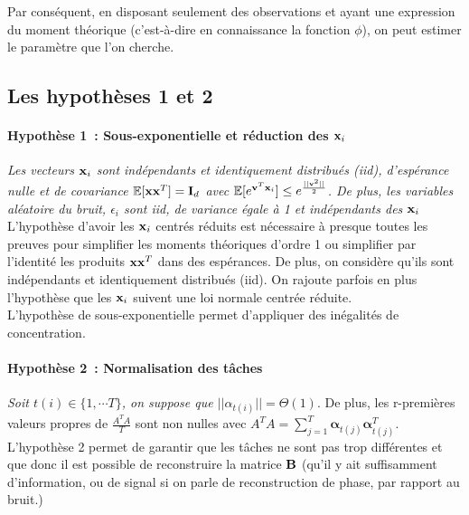 \documentclass[12pt]{article}
\begin{document}
Par conséquent, en disposant seulement des observations et ayant une expression du moment théorique (c'est-à-dire en connaissance la fonction $\phi$), on peut estimer le paramètre que l'on cherche. 

\subsection{Les hypothèses 1 et 2}\label{hypothèses}
\paragraph*{Hypothèse 1~: Sous-exponentielle et réduction des ${\bf x}_i$}\label{hyp2} \textit{Les vecteurs ${\bf x}_i$ sont indépendants et identiquement distribués (iid), d'espérance nulle et de covariance $\mathbb{E}[{\bf x}{\bf x}^T] = {\bf I}_d$ avec $\mathbb{E}[e^{{\bf v}^T{\bf x}_i}] \leq e^{\frac{\lvert \lvert {\bf v}^2 \rvert \rvert}{2}}$. De plus, les variables aléatoire du bruit, $\epsilon_i$ sont iid, de variance égale à 1 et indépendants des ${\bf x}_i$} \\

\noindent L'hypothèse d'avoir les ${\bf x}_i$ centrés réduits est nécessaire à presque toutes les preuves pour simplifier les moments théoriques d'ordre 1 ou simplifier par l'identité les produits ${\bf x}{\bf x}^T$ dans des espérances. De plus, on considère qu'ils sont indépendants et identiquement distribués (iid). On rajoute parfois en plus l'hypothèse que les ${\bf x}_i$ suivent une loi normale centrée réduite.\\
L'hypothèse de sous-exponentielle permet d'appliquer des inégalités de concentration.\\

\paragraph*{Hypothèse 2~: Normalisation des tâches}\label{hyp1} \textit{Soit $t(i) \in \{1, \cdots T\}$, on suppose que $\lvert \lvert \alpha_{t(i)} \rvert \rvert = \varTheta(1)$}. De plus, les r-premières valeurs propres de $\frac{A^TA}{T}$ sont non nulles avec $A^TA = \sum^T_{j = 1}\bm{\alpha}_{t(j)}\bm{\alpha}^T_{t(j)}$.\\

\noindent L'hypothèse 2 permet de garantir que les tâches ne sont pas trop différentes et que donc il est possible de reconstruire la matrice $\bf B$ (qu'il y ait suffisamment d'information, ou de signal si on parle de reconstruction de phase, par rapport au bruit.)\\
\end{document}
